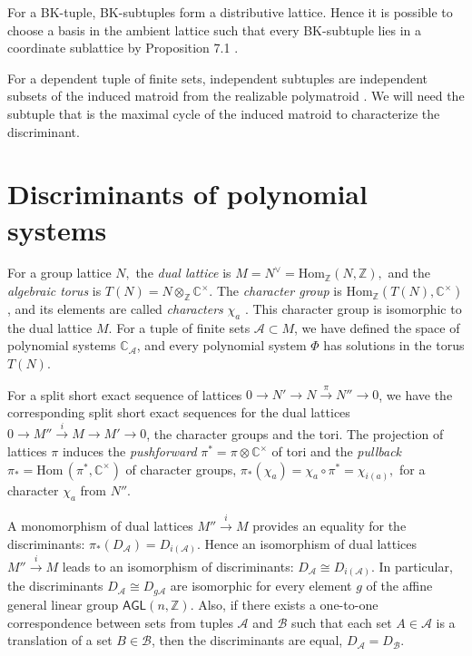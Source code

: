 \documentclass[11pt]{article}
\theoremstyle{plain}
\theoremstyle{definition}
\theoremstyle{remark}
\theoremstyle{plain}
\theoremstyle{plain}
\theoremstyle{plain}
\theoremstyle{definition}
\begin{document}
For a BK-tuple, BK-subtuples form a distributive lattice. Hence it
is possible to choose a basis in the ambient lattice such that every
BK-subtuple lies in a coordinate sublattice by Proposition 7.1 \cite{polishchuk_quadratic_2005}.

For a dependent tuple of finite sets, independent subtuples are independent
subsets of the induced matroid from the realizable polymatroid \cite{pokidkin_combinatorics_2025}.
We will need the subtuple that is the maximal cycle of the induced
matroid to characterize the discriminant.

\section{\label{Section. Discriminants-of-polynomial}Discriminants of polynomial
systems}

For a group lattice $N,$ the \textit{dual lattice} is $M=N^{\vee}=\mathrm{Hom}_{\mathbb{Z}}(N,\mathbb{Z}),$
and the \textit{algebraic torus} is $T(N)=N\otimes_{\mathbb{Z}}\mathbb{C}^{\times}.$
The \textit{character group}\textbf{ }is $\mathrm{Hom}_{\mathbb{Z}}(T(N),\mathbb{C}^{\times})$,
and its elements are called \textit{characters} $\chi_{a}$ \cite{fulton_introduction_1993,cox_toric_2011}.
This character group is isomorphic to the dual lattice $M$. For a
tuple of finite sets $\mathscr{A}\subset M$, we have defined the
space of polynomial systems $\mathbb{C}_{\mathscr{A}}$, and every
polynomial system $\Phi$ has solutions in the torus $T(N).$

For a split short exact sequence of lattices $0\rightarrow N'\rightarrow N\overset{\pi}{\rightarrow}N''\rightarrow0$,
we have the corresponding split short exact sequences for the dual
lattices $0\rightarrow M''\overset{i}{\rightarrow}M\rightarrow M'\rightarrow0$,
the character groups and the tori. The projection of lattices $\pi$
induces the \textit{pushforward} $\pi^{*}=\pi\otimes\mathbb{C}^{\times}$
of tori and the \textit{pullback} $\pi_{*}=\mathrm{Hom}\,(\pi^{*},\mathbb{C}^{\times})$
of character groups, $\pi_{*}(\chi_{a})=\chi_{a}\circ\pi^{*}=\chi_{i(a)},$
for a character $\chi_{a}$ from $N''$. 

A monomorphism of dual lattices $M''\overset{i}{\rightarrow}M$ provides
an equality for the discriminants: $\pi_{*}(D_{\mathscr{A}})=D_{i(\mathscr{A})}$.
Hence an isomorphism of dual lattices $M''\overset{i}{\rightarrow}M$
leads to an isomorphism of discriminants: $D_{\mathscr{A}}\cong D_{i(\mathscr{A})}$.
In particular, the discriminants $D_{\mathscr{A}}\cong D_{g\mathscr{A}}$
are isomorphic for every element $g$ of the affine general linear
group $\mathsf{AGL}(n,\mathbb{Z})$. Also, if there exists a one-to-one
correspondence between sets from tuples $\mathscr{A}$ and $\mathscr{B}$
such that each set $A\in\mathscr{A}$ is a translation of a set $B\in\mathscr{B}$,
then the discriminants are equal, $D_{\mathscr{A}}=D_{\mathscr{B}}$. 
\end{document}
